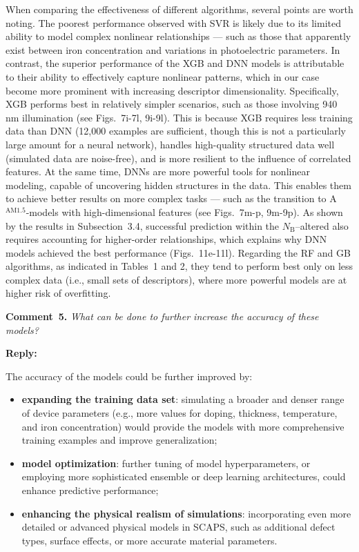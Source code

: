 \documentclass[a4paper,fleqn]{cas-sc}
\begin{document}
When comparing the effectiveness of different algorithms, several points are worth noting.
The poorest performance observed with SVR is likely due to its limited ability
to model complex nonlinear relationships ---
such as those that apparently exist between iron concentration and variations in photoelectric parameters.
In contrast, the superior performance of the XGB and DNN models is attributable to
their ability to effectively capture nonlinear patterns, which in our case become more prominent with increasing descriptor dimensionality.
Specifically, XGB performs best in relatively simpler scenarios, such as those involving 940 nm illumination
(see Figs.~7i-7l, 9i-9l).
This is because XGB requires less training data than DNN
(12,000 examples are sufficient, though this is not a particularly large amount for a neural network),
handles high-quality structured data well (simulated data are noise-free),
and is more resilient to the influence of correlated features.
At the same time, DNNs are more powerful tools for nonlinear modeling,
capable of uncovering hidden structures in the data.
This enables them to achieve better results on more complex tasks ---
such as the transition to A$^\mathrm{AM1.5}$-models with high-dimensional features
(see Figs.~7m-p, 9m-9p).
As shown by the results in Subsection~3.4, successful prediction within the
$N_\mathrm{B}$--altered also requires accounting for higher-order relationships,
which explains why DNN models achieved the best performance (Figs.~11e-11l).
Regarding the RF and GB algorithms, as indicated in Tables~1 and 2,
they tend to perform best only on less complex data
(i.e., small sets of descriptors), where more powerful models are at higher risk of overfitting.

\vspace{1cm}
\noindent
\textcolor[rgb]{0.00,0.50,1.00}{\textbf{Comment~5.}}
\emph{What can be done to further increase the accuracy of these models?}

\noindent
\textcolor[rgb]{0.51,0.00,0.00}{\textbf{Reply:}}

The accuracy of the models could be further improved by:
\begin{itemize}
    \item \textbf{expanding the training data set}: simulating a broader and denser range of device parameters (e.g., more values for doping, thickness, temperature, and iron concentration) would provide the models with more comprehensive training examples and improve generalization;
    \item \textbf{model optimization}: further tuning of model hyperparameters, or employing more sophisticated ensemble or deep learning architectures, could enhance predictive performance;
    \item \textbf{enhancing the physical realism of simulations}: incorporating even more detailed or advanced physical models in SCAPS, such as additional defect types, surface effects, or more accurate material parameters.
\end{itemize}
\end{document}
